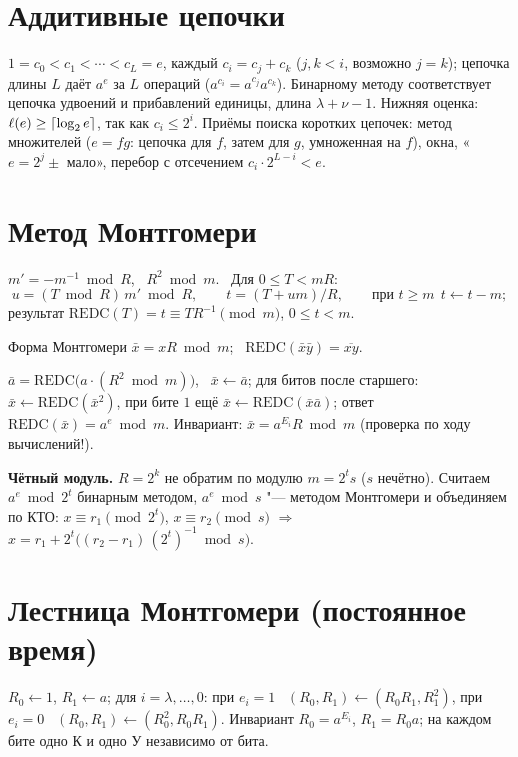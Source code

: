 \documentclass{ca-handout}
\begin{document}
\section{Аддитивные цепочки}
$1 = c_0 < c_1 < \cdots < c_L = e$, каждый $c_i = c_j + c_k$ ($j, k < i$, возможно $j = k$);
цепочка длины $L$ даёт $a^e$ за $L$ операций ($a^{c_i} = a^{c_j} a^{c_k}$).
Бинарному методу соответствует цепочка удвоений и прибавлений единицы, длина
$\lambda + \nu - 1$. Нижняя оценка: $\ell(e) \ge \lceil\log_2 e\rceil$, так как $c_i \le 2^i$.
Приёмы поиска коротких цепочек: метод множителей ($e = fg$: цепочка для $f$, затем для $g$,
умноженная на $f$), окна, «$e = 2^j \pm$ мало», перебор с отсечением $c_i \cdot 2^{L - i} < e$.

\section{Метод Монтгомери}
\begin{reminder}[title={Параметры: $m$ нечётно, $R = 2^k$ "--- наименьшая степень двойки, $R > m$}]
$m' = -m^{-1} \bmod R$, \ $R^2 \bmod m$. \ Для $0 \le T < mR$:
\[
  u = (T \bmod R)\, m' \bmod R, \qquad t = (T + um)/R, \qquad
  \text{при } t \ge m \ \ t \gets t - m;
\]
результат $\mathrm{REDC}(T) = t \equiv TR^{-1} \pmod m$, $0 \le t < m$.
\end{reminder}
Форма Монтгомери $\bar x = xR \bmod m$; \ $\mathrm{REDC}(\bar x \bar y) = \overline{xy}$.
\begin{reminder}[title={Возведение в степень: вход и выход "--- по одному REDC}]
$\bar a = \mathrm{REDC}\bigl(a \cdot (R^2 \bmod m)\bigr)$, \ $\bar x \gets \bar a$; для битов
после старшего: $\bar x \gets \mathrm{REDC}(\bar x^2)$, при бите $1$ ещё
$\bar x \gets \mathrm{REDC}(\bar x \bar a)$; ответ $\mathrm{REDC}(\bar x) = a^e \bmod m$.
Инвариант: $\bar x = a^{E_i} R \bmod m$ (проверка по ходу вычислений!).
\end{reminder}
\textbf{Чётный модуль.} $R = 2^k$ не обратим по модулю $m = 2^t s$ ($s$ нечётно). Считаем
$a^e \bmod 2^t$ бинарным методом, $a^e \bmod s$ "--- методом Монтгомери и объединяем по КТО:
$x \equiv r_1 \pmod{2^t}$, $x \equiv r_2 \pmod s$ $\Rightarrow$
$x = r_1 + 2^t \bigl((r_2 - r_1)\,(2^t)^{-1} \bmod s\bigr)$.

\section{Лестница Монтгомери (постоянное время)}
$R_0 \gets 1$, $R_1 \gets a$; для $i = \lambda, \dots, 0$: при $e_i = 1$ \
$(R_0, R_1) \gets (R_0 R_1, R_1^2)$, при $e_i = 0$ \ $(R_0, R_1) \gets (R_0^2, R_0 R_1)$.
Инвариант $R_0 = a^{E_i}$, $R_1 = R_0 a$; на каждом бите одно К и одно У независимо от бита.
\end{document}
